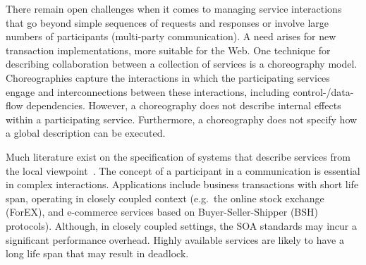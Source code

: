 \documentclass{llncs}
\begin{document}
There remain open challenges when it comes to managing service interactions that go beyond simple sequences of requests and responses or involve large numbers of participants (multi-party communication). A need arises for new transaction implementations, more suitable for the Web.
One technique for describing collaboration between a collection of services is a choreography model.
Choreographies capture the interactions in which the participating services engage and interconnections between these interactions, including control-/data-flow dependencies.
However, a choreography does not describe internal effects within a participating service. Furthermore, a choreography does not specify how a global description can be executed.

Much literature exist on the specification of systems that describe services from the local viewpoint~\cite{cs-processes,alg-seq-processes}.
The concept of a participant in a communication is essential in complex interactions. Applications include business transactions with short life span, operating in closely coupled context (e.g.\ the online stock exchange (ForEX), and e-commerce services based on Buyer-Seller-Shipper (BSH) protocols). Although, in closely coupled settings, the SOA standards may incur a significant performance overhead.
Highly available services are likely to have a long life span that may result in deadlock.
\end{document}
